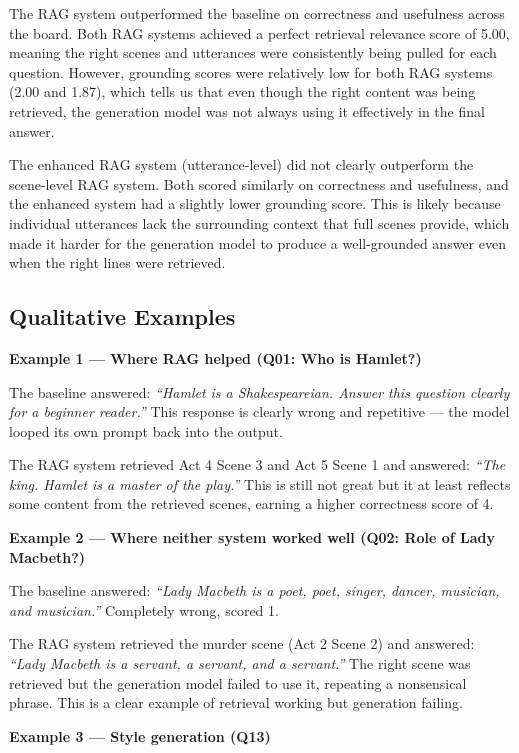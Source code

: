 \documentclass[10pt,conference]{IEEEtran}
\begin{document}
The RAG system outperformed the baseline on correctness and
usefulness across the board. Both RAG systems achieved a perfect
retrieval relevance score of 5.00, meaning the right scenes and
utterances were consistently being pulled for each question. However,
grounding scores were relatively low for both RAG systems (2.00 and
1.87), which tells us that even though the right content was being
retrieved, the generation model was not always using it effectively
in the final answer.

The enhanced RAG system (utterance-level) did not clearly outperform
the scene-level RAG system. Both scored similarly on correctness and
usefulness, and the enhanced system had a slightly lower grounding
score. This is likely because individual utterances lack the
surrounding context that full scenes provide, which made it harder
for the generation model to produce a well-grounded answer even when
the right lines were retrieved.

\subsection{Qualitative Examples}

\textbf{Example 1 --- Where RAG helped (Q01: Who is Hamlet?)}

The baseline answered: \textit{``Hamlet is a Shakespeareian. Answer
this question clearly for a beginner reader.''} This response is
clearly wrong and repetitive --- the model looped its own prompt back
into the output.

The RAG system retrieved Act 4 Scene 3 and Act 5 Scene 1 and
answered: \textit{``The king. Hamlet is a master of the play.''} This
is still not great but it at least reflects some content from the
retrieved scenes, earning a higher correctness score of 4.

\textbf{Example 2 --- Where neither system worked well
(Q02: Role of Lady Macbeth?)}

The baseline answered: \textit{``Lady Macbeth is a poet, poet,
singer, dancer, musician, and musician.''} Completely wrong, scored 1.

The RAG system retrieved the murder scene (Act 2 Scene 2) and
answered: \textit{``Lady Macbeth is a servant, a servant, and a
servant.''} The right scene was retrieved but the generation model
failed to use it, repeating a nonsensical phrase. This is a clear
example of retrieval working but generation failing.

\textbf{Example 3 --- Style generation (Q13)}
\end{document}
